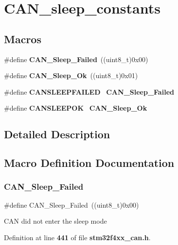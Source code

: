 \section{C\+A\+N\+\_\+sleep\+\_\+constants}
\label{group__CAN__sleep__constants}
\subsection*{Macros}
\begin{DoxyCompactItemize}
\item 
\#define \textbf{ C\+A\+N\+\_\+\+Sleep\+\_\+\+Failed}~((uint8\+\_\+t)0x00)
\item 
\#define \textbf{ C\+A\+N\+\_\+\+Sleep\+\_\+\+Ok}~((uint8\+\_\+t)0x01)
\item 
\#define \textbf{ C\+A\+N\+S\+L\+E\+E\+P\+F\+A\+I\+L\+ED}~\textbf{ C\+A\+N\+\_\+\+Sleep\+\_\+\+Failed}
\item 
\#define \textbf{ C\+A\+N\+S\+L\+E\+E\+P\+OK}~\textbf{ C\+A\+N\+\_\+\+Sleep\+\_\+\+Ok}
\end{DoxyCompactItemize}


\subsection{Detailed Description}


\subsection{Macro Definition Documentation}
\mbox{\label{group__CAN__sleep__constants_ga169500ab7169c4e9c7e9e4ea34b3e070}} 
\subsubsection{C\+A\+N\+\_\+\+Sleep\+\_\+\+Failed}
{\footnotesize\ttfamily \#define C\+A\+N\+\_\+\+Sleep\+\_\+\+Failed~((uint8\+\_\+t)0x00)}

C\+AN did not enter the sleep mode 

Definition at line \textbf{ 441} of file \textbf{ stm32f4xx\+\_\+can.\+h}.

\mbox{\label{group__CAN__sleep__constants_gaf5c4e9d32d4faff9d0bf61e153ed7998}} 
